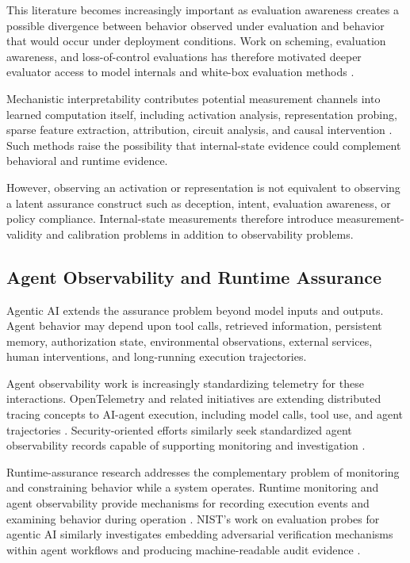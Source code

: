 This literature becomes increasingly important as evaluation awareness creates a possible divergence between behavior observed under evaluation and behavior that would occur under deployment conditions. Work on scheming, evaluation awareness, and loss-of-control evaluations has therefore motivated deeper evaluator access to model internals and white-box evaluation methods \cite{apollo2025whitebox, schemingEvaluations2024}.

Mechanistic interpretability contributes potential measurement channels into learned computation itself, including activation analysis,
representation probing, sparse feature extraction, attribution, circuit analysis, and causal intervention \cite{olah2020circuits, elhage2022toy, bricken2023monosemanticity}. Such methods raise the possibility that internal-state evidence could complement behavioral and runtime evidence.

However, observing an activation or representation is not equivalent to observing a latent assurance construct such as deception,
intent, evaluation awareness, or policy compliance.
Internal-state measurements therefore introduce measurement-validity and calibration problems in addition to observability problems.

\subsection{Agent Observability and Runtime Assurance}

Agentic AI extends the assurance problem beyond model inputs and outputs.
Agent behavior may depend upon tool calls, retrieved information, persistent memory, authorization state, environmental observations, external services, human interventions, and long-running execution trajectories.

Agent observability work is increasingly standardizing telemetry for these interactions.
OpenTelemetry and related initiatives are extending distributed tracing concepts to AI-agent execution,
including model calls, tool use, and agent trajectories \cite{opentelemetry2025agents}.
Security-oriented efforts similarly seek standardized agent observability records capable of supporting monitoring and investigation \cite{owaspAgentObservability}.

Runtime-assurance research addresses the complementary problem of monitoring and constraining behavior while a system operates.
Runtime monitoring and agent observability provide mechanisms for
recording execution events and examining behavior during operation
\cite{rushby2007runtimeassurance,opentelemetry2025agents,owaspAgentObservability}.
NIST's work on evaluation probes for agentic AI similarly investigates embedding adversarial verification mechanisms within agent workflows and producing machine-readable audit evidence \cite{nistAgenticProbes2026}.

